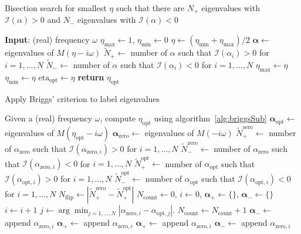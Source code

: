 \begin{algorithm}
\caption{Bisection search for smallest $\eta$ such that there are $N_+$ eigenvalues with $\mathcal{I}(\alpha)>0$ and $N_-$ eigenvalues with $\mathcal{I}(\alpha)<0$}\label{alg:briggsSub}
\begin{algorithmic}
\State\textbf{Input}: (real) frequency $\omega$
\State $\eta_{\max} \gets 1$, $\eta_{\min} \gets 0$
\State $\eta\gets (\eta_{\min}+\eta_{\max})/2$
\State $\bm{\alpha} \gets$ eigenvalues of $M(\eta-i\omega)$
\State $\tilde{N}_+\gets$ number of $\alpha$ such that $\mathcal{I}(\alpha_i)>0$ for $i=1,\dots,N$
\State $\tilde{N}_-\gets$ number of $\alpha$ such that $\mathcal{I}(\alpha_i)<0$ for $i=1,\dots,N$
\State $\eta_{\max}\gets\eta$
\Else
\State $\eta_{\min}\gets\eta$
\EndIf
\EndWhile
\State $\mathrm{eta}_{\mathrm{opt}}\gets\eta$
\State\textbf{return} $\eta_{\mathrm{opt}}$
\end{algorithmic}
\end{algorithm}

\begin{algorithm}
\caption{Apply Briggs' criterion to label eigenvalues}\label{alg:briggs}
\begin{algorithmic}
\State Given a (real) frequency $\omega$, compute $\eta_{\mathrm{opt}}$ using algorithm~\ref{alg:briggsSub}
\State $\bm{\alpha}_{\mathrm{opt}}\gets$ eigenvalues of $M(\eta_{\mathrm{opt}}-i\omega)$
\State $\bm{\alpha}_{\mathrm{zero}} \gets$ eigenvalues of $M(-i\omega)$
\State $\tilde{N}_+^{\mathrm{zero}}\gets$ number of $\alpha_{\mathrm{zero}}$ such that $\mathcal{I}(\alpha_{\mathrm{zero},i})>0$ for $i=1,\dots,N$
\State $\tilde{N}_-^{\mathrm{zero}}\gets$ number of $\alpha_{\mathrm{zero}}$ such that $\mathcal{I}(\alpha_{\mathrm{zero},i})<0$ for $i=1,\dots,N$
\State $\tilde{N}_+^{\mathrm{opt}}\gets$ number of $\alpha_{\mathrm{opt}}$ such that $\mathcal{I}(\alpha_{\mathrm{opt},i})>0$ for $i=1,\dots,N$
\State $\tilde{N}_-^{\mathrm{opt}}\gets$ number of $\alpha_{\mathrm{opt}}$ such that $\mathcal{I}(\alpha_{\mathrm{opt},i})<0$ for $i=1,\dots,N$
\State $N_{\mathrm{flip}}\gets|\tilde{N}_+^{\mathrm{zero}}-\tilde{N}_+^{\mathrm{opt}}|$
\State $N_{\mathrm{count}} \gets 0$, $i\gets0$, $\bm{\alpha}_+\gets \{\}$, $\bm{\alpha}_-\gets \{\}$
\State $i\gets i + 1$
\State $j\gets\arg\min_{j=1,\dots,N}|\alpha_{\mathrm{zero},i}-\alpha_{\mathrm{opt},j}|$.
\State $N_{\mathrm{count}}\gets N_{\mathrm{count}} + 1$
\State $\bm{\alpha}_-\gets$ append $\alpha_{\mathrm{zero},i}$
\Else
\State $\bm{\alpha}_+\gets$ append $\alpha_{\mathrm{zero},i}$
\EndIf
\Else
{}
\State $\bm{\alpha}_+\gets$ append $\alpha_{\mathrm{zero},i}$
\Else
\State $\bm{\alpha}_-\gets$ append $\alpha_{\mathrm{zero},i}$
\EndIf
\EndIf
\EndWhile
\end{algorithmic}
\end{algorithm}